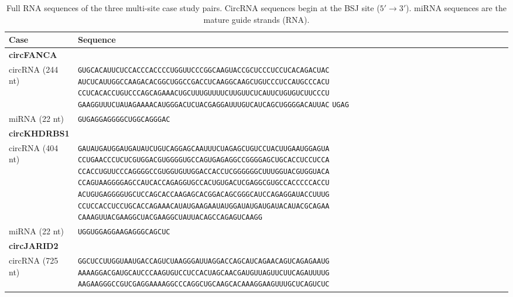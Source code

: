 \begin{table}[ht]
\centering
\small
\caption{Full RNA sequences of the three multi-site case study pairs.
CircRNA sequences begin at the BSJ site ($5'\to3'$).
miRNA sequences are the mature guide strands (RNA).}
\label{tab:multisite_seq}
\begin{tabular}{@{}p{2.6cm}l@{}}
\toprule
Case & Sequence \\
\midrule
\multicolumn{1}{l}{\textbf{circFANCA}} & \\
circRNA (244 nt) &
  \texttt{GUGCACAUUCUCCACCCACCCCUGGUUCCCGGCAAGUACCGCUCCCUCCUCACAGACUAC}\newline
  \texttt{AUCUCAUUGGCCAAGACACGGCUGGCCGACCUCAAGGCAAGCUGUCCCUCCAUGCCCACU}\newline
  \texttt{CCUCACACCUGUCCCAGCAGAAACUGCUUUGUUUUCUUGUUCUCAUUCUGUGUCUUCCCU}\newline
  \texttt{GAAGGUUUCUAUAGAAAACAUGGGACUCUACGAGGAUUUGUCAUCAGCUGGGGACAUUAC}\newline
  \texttt{UGAG} \\[2pt]
miRNA (22 nt) & \texttt{GUGAGGAGGGGCUGGCAGGGAC} \\
\midrule
\multicolumn{1}{l}{\textbf{circKHDRBS1}} & \\
circRNA (404 nt) &
  \texttt{GAUAUGAUGGAUGAUAUCUGUCAGGAGCAAUUUCUAGAGCUGUCCUACUUGAAUGGAGUA}\newline
  \texttt{CCUGAACCCUCUCGUGGACGUGGGGUGCCAGUGAGAGGCCGGGGAGCUGCACCUCCUCCA}\newline
  \texttt{CCACCUGUUCCCAGGGGCCGUGGUGUUGGACCACCUCGGGGGGCUUUGGUACGUGGUACA}\newline
  \texttt{CCAGUAAGGGGAGCCAUCACCAGAGGUGCCACUGUGACUCGAGGCGUGCCACCCCCACCU}\newline
  \texttt{ACUGUGAGGGGUGCUCCAGCACCAAGAGCACGGACAGCGGGCAUCCAGAGGAUACCUUUG}\newline
  \texttt{CCUCCACCUCCUGCACCAGAAACAUAUGAAGAAUAUGGAUAUGAUGAUACAUACGCAGAA}\newline
  \texttt{CAAAGUUACGAAGGCUACGAAGGCUAUUACAGCCAGAGUCAAGG} \\[2pt]
miRNA (22 nt) & \texttt{UGGUGGAGGAAGAGGGCAGCUC} \\
\midrule
\multicolumn{1}{l}{\textbf{circJARID2}} & \\
circRNA (725 nt) &
  \texttt{GGCUCCUUGGUAAUGACCAGUCUAAGGGAUUAGGACCAGCAUCAGAACAGUCAGAGAAUG}\newline
  \texttt{AAAAGGACGAUGCAUCCCAAGUGUCCUCCACUAGCAACGAUGUUAGUUCUUCAGAUUUUG}\newline
  \texttt{AAGAAGGGCCGUCGAGGAAAAGGCCCAGGCUGCAAGCACAAAGGAAGUUUGCUCAGUCUC}\newline

\end{tabular}
\end{table}
